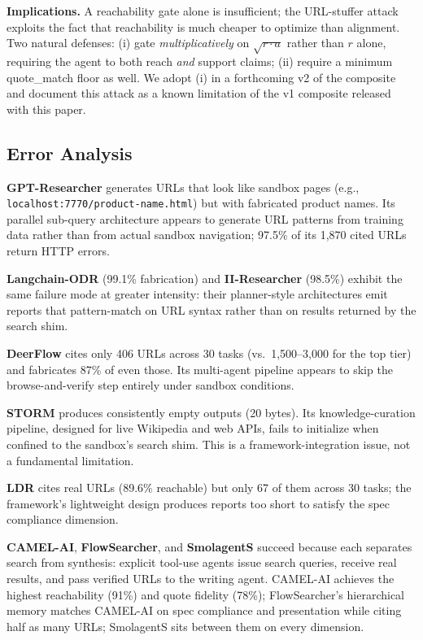 \documentclass{article}
\begin{document}
\textbf{Implications.} A reachability gate alone is insufficient; the URL-stuffer attack exploits the fact that reachability is much cheaper to optimize than alignment. Two natural defenses: (i) gate \emph{multiplicatively} on $\sqrt{r \cdot a}$ rather than $r$ alone, requiring the agent to both reach \emph{and} support claims; (ii) require a minimum quote\_match floor as well. We adopt (i) in a forthcoming v2 of the composite and document this attack as a known limitation of the v1 composite released with this paper.

\subsection{Error Analysis}
\label{sec:errors}

\textbf{GPT-Researcher} generates URLs that look like sandbox pages (e.g., \texttt{localhost:7770/product-name.html}) but with fabricated product names. Its parallel sub-query architecture appears to generate URL patterns from training data rather than from actual sandbox navigation; 97.5\% of its 1{,}870 cited URLs return HTTP errors.

\textbf{Langchain-ODR} (99.1\% fabrication) and \textbf{II-Researcher} (98.5\%) exhibit the same failure mode at greater intensity: their planner-style architectures emit reports that pattern-match on URL syntax rather than on results returned by the search shim.

\textbf{DeerFlow} cites only 406 URLs across 30 tasks (vs.\ 1{,}500--3{,}000 for the top tier) and fabricates 87\% of even those. Its multi-agent pipeline appears to skip the browse-and-verify step entirely under sandbox conditions.

\textbf{STORM} produces consistently empty outputs (20 bytes). Its knowledge-curation pipeline, designed for live Wikipedia and web APIs, fails to initialize when confined to the sandbox's search shim. This is a framework-integration issue, not a fundamental limitation.

\textbf{LDR} cites real URLs (89.6\% reachable) but only 67 of them across 30 tasks; the framework's lightweight design produces reports too short to satisfy the spec compliance dimension.

\textbf{CAMEL-AI}, \textbf{FlowSearcher}, and \textbf{SmolagentS} succeed because each separates search from synthesis: explicit tool-use agents issue search queries, receive real results, and pass verified URLs to the writing agent. CAMEL-AI achieves the highest reachability (91\%) and quote fidelity (78\%); FlowSearcher's hierarchical memory matches CAMEL-AI on spec compliance and presentation while citing half as many URLs; SmolagentS sits between them on every dimension.
\end{document}
